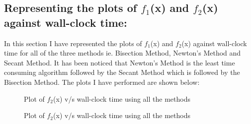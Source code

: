 \documentclass[12pt,a4paper]{article}
\begin{document}
\subsection{Representing the plots of $f_1$(x) and $f_2$(x) against wall-clock time:}
In this section I have represented the plots of $f_1$(x) and $f_2$(x) against wall-clock time for all of the three methods ie. Bisection Method, Newton's Method and Secant Method. It has been noticed that Newton's Method is the least time consuming algorithm followed by the Secant Method which is followed by the Bisection Method. The plots I have performed are shown below:
\begin{figure}[!ht]
	\begin{center}
	\end{center}
	\caption{Plot of $f_2$(x) v/s wall-clock time using all the methods}
\end{figure}
\begin{figure}[!ht]
	\begin{center}
	\end{center}
	\caption{Plot of $f_2$(x) v/s wall-clock time using all the methods}
\end{figure}
\end{document}
